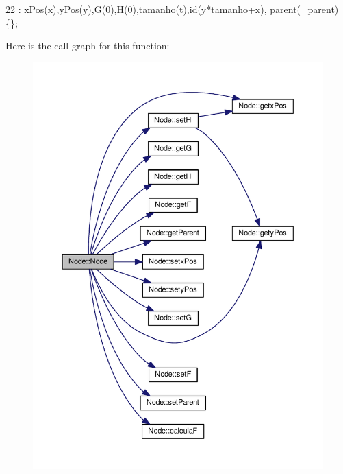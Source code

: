 \begin{DoxyCode}
22 : \hyperlink{classNode_a4c5b1e397eba5f462edc72d5c031b33e}{xPos}(x),\hyperlink{classNode_ace45ec1cc1cc78ef699918a7adeb1dad}{yPos}(y),\hyperlink{classNode_a3c6a67023068f762eaaa8a4861ab3e9f}{G}(0),\hyperlink{classNode_a26426055f336a81dc05680b981e4c270}{H}(0),\hyperlink{classNode_ab61bfe3b52ba63f10939bf88270321e0}{tamanho}(t),\hyperlink{classNode_a59a543130a10c95f1e8642cf8c5645e8}{id}(y*\hyperlink{classNode_ab61bfe3b52ba63f10939bf88270321e0}{tamanho}+x),
      \hyperlink{classNode_ad8184598cdea70e4bbdfd76f2b0f9e85}{parent}(\_parent)\{\};
\end{DoxyCode}


Here is the call graph for this function\+:
\nopagebreak
\begin{figure}[H]
\begin{center}
\leavevmode
\includegraphics[width=350pt]{classNode_a2d13f7f1172705cddb79039c2fabbba6_cgraph}
\end{center}
\end{figure}




